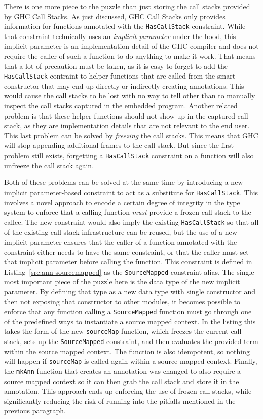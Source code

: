 \documentclass[fontsize=11pt,a4paper,parskip=half,numbers=noenddot]{scrartcl}
\newcommand{\hask}[1]{\texttt{#1}}
\begin{document}
There is one more piece to the puzzle than just storing the call stacks provided
by GHC Call Stacks. As just discussed, GHC Call Stacks only provides information
for functions annotated with the \hask{HasCallStack} constraint. While that
constraint technically uses an \emph{implicit parameter} under the hood, this
implicit parameter is an implementation detail of the GHC compiler and does not
require the caller of such a function to do anything to make it work. That means
that a lot of precaution must be taken, as it is easy to forget to add the
\hask{HasCallStack} contraint to helper functions that are called from the smart
constructor that may end up directly or indirectly creating annotations. This
would cause the call stacks to be lost with no way to tell other than to
manually inspect the call stacks captured in the embedded program. Another
related problem is that these helper functions should not show up in the
captured call stack, as they are implementation details that are not relevant to
the end user. This last problem can be solved by \emph{freezing} the call
stacks. This means that GHC will stop appending additional frames to the call
stack. But since the first problem still exists, forgetting a
\hask{HasCallStack} constraint on a function will also unfreeze the call stack
again.

Both of these problems can be solved at the same time by introducing a new
implicit parameter-based constraint to act as a substitute for
\hask{HasCallStack}. This involves a novel approach to encode a certain degree
of integrity in the type system to enforce that a calling function \emph{must}
provide a frozen call stack to the callee. The new constraint would also imply
the existing \hask{HasCallStack} so that all of the existing call stack
infrastructure can be reused, but the use of a new implicit parameter ensures
that the caller of a function annotated with the constraint either needs to have
the same constraint, or that the caller must set that implicit parameter before
calling the function. This constraint is defined in
Listing~\ref{src:ann-sourcemapped} as the \hask{SourceMapped} constraint alias.
The single most important piece of the puzzle here is the data type of the new
implicit parameter. By defining that type as a new data type with single
constructor and then not exposing that constructor to other modules, it becomes
possible to enforce that any function calling a \hask{SourceMapped} function
must go through one of the predefined ways to instantiate a source mapped
context. In the listing this takes the form of the new \hask{sourceMap}
function, which freezes the current call stack, sets up the \hask{SourceMapped}
constraint, and then evaluates the provided term within the source mapped
context. The function is also idempotent, so nothing will happen if
\hask{sourceMap} is called again within a source mapped context. Finally, the
\hask{mkAnn} function that creates an annotation was changed to also require a
source mapped context so it can then grab the call stack and store it in the
annotation. This approach ends up enforcing the use of frozen call stacks, while
significantly reducing the risk of running into the pitfalls mentioned in the
previous paragraph.
\end{document}
